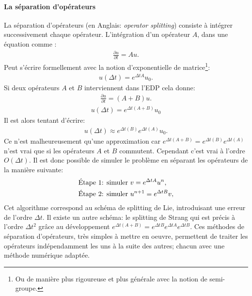        \paragraph{La séparation d'opérateurs}
            La séparation d'opérateurs (en Anglais: \textit{operator splitting}) consiste à intégrer successivement chaque opérateur.
            L'intégration d'un opérateur $A$, dans une équation comme :
            \begin{align}\frac{\partial u}{\partial t} = Au.\end{align}
            Peut s'écrire formellement avec la notion d'exponentielle de matrice\footnote{Ou de manière plus rigoureuse et plus générale avec la notion de semi-groupe.}:
            \begin{align}u(\Delta t) = e^{\Delta tA}u_0.\end{align}
            Si deux opérateurs $A$ et $B$ interviennent dans l'EDP cela donne:
            \begin{align}\frac{\partial u}{\partial t} = (A+B)u.\end{align}
            \begin{align}u(\Delta t) = e^{\Delta t (A+B)}u_0 \end{align}
            Il est alors tentant d'écrire:
            \begin{align}u(\Delta t)\approx e^{\Delta t(B)}e^{\Delta t(A)}u_0.\end{align}
            Ce n'est malheureusement qu'une approximation car $e^{\Delta t(A+B)} = e^{\Delta t(B)}e^{\Delta t(A)}$ n'est vrai que si les opérateurs $A$ et $B$ commutent.
            Cependant c'est vrai à l'ordre $O(\Delta t)$. 
            Il est donc possible de simuler le problème en séparant les opérateurs de la manière suivante: 
            \begin{align}
                \text{Étape 1: simuler }&v=e^{\Delta t A}u^n,\notag\\\notag
                \text{Étape 2: simuler }&u^{n+1}=e^{\Delta t B}v,\\
            \end{align}
            Cet algorithme correspond au schéma de splitting de Lie, introduisant une erreur de l'ordre $\Delta t$. 
            Il existe un autre schéma: le splitting de Strang qui est précis à l'ordre $\Delta t^2$ grâce au développement $e^{\Delta t (A+B)} = e^{\Delta t B}e^{\Delta t A} e^{\Delta t B}$.
            Ces méthodes de séparation d'opérateurs, très simples à mettre en oeuvre, permettent de traiter les opérateurs indépendamment les uns à la suite des autres; chacun avec une méthode numérique adaptée.
